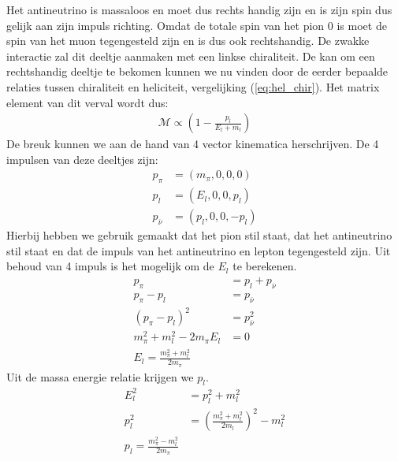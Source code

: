 \documentclass[../main.tex]{subfiles}
\begin{document}
Het antineutrino is massaloos en moet dus rechts handig zijn en is zijn spin dus gelijk aan zijn impuls richting. Omdat de totale spin van het pion 0 is moet de spin van het muon tegengesteld zijn en is dus ook rechtshandig. De zwakke interactie zal dit deeltje aanmaken met een linkse chiraliteit. De kan om een rechtshandig deeltje te bekomen kunnen we nu vinden door de eerder bepaalde relaties tussen chiraliteit en heliciteit, vergelijking (\ref{eq:hel_chir}). Het matrix element van dit verval wordt dus:
\begin{equation}
    \begin{aligned}
        \label{eq:pion_verval_matrix}
        \mathcal{M} \propto \left( 1 - \frac{p_l}{E_l + m_l} \right)
    \end{aligned}
\end{equation}
De breuk kunnen we aan de hand van 4 vector kinematica herschrijven. De 4 impulsen van deze deeltjes zijn:
\begin{equation}
    \begin{aligned}
        \label{eq:4_impuls_pion_verval}
        p_\pi &= (m_\pi,0,0,0)\\
        p_l &= (E_l, 0, 0, p_l)\\
        p_{\overline \nu} &= (p_l, 0, 0, -p_l)
    \end{aligned}
\end{equation}
Hierbij hebben we gebruik gemaakt dat het pion stil staat, dat het antineutrino stil staat en dat de impuls van het antineutrino en lepton tegengesteld zijn. Uit behoud van 4 impuls is het mogelijk om de $E_l$ te berekenen.
\begin{equation}
    \begin{aligned}
        \label{eq:berekenen_e_l}
        p_\pi &= p_l + p_{\overline \nu}\\
        p_\pi - p_l &= p_{\overline \nu}\\
        (p_\pi - p_l)^2 &= p_{\overline \nu}^2\\
        m_\pi^2+m_l^2-2m_\pi E_l &= 0\\
        E_l = \frac{m_\pi^2 + m_l^2}{2m_\pi}
    \end{aligned}
\end{equation}
Uit de massa energie relatie krijgen we $p_l$.
\begin{equation}
    \begin{aligned}
        \label{eq:berekenen_p_l}
        E_l^2 &= p_l^2 + m_l^2\\
        p_l^2 &= \left( \frac{m_\pi^2+m_l^2}{2m_l} \right)^2-m_l^2\\
        p_l = \frac{m_\pi^2-m_l^2}{2m_\pi} 
    \end{aligned}
\end{equation}
\end{document}
